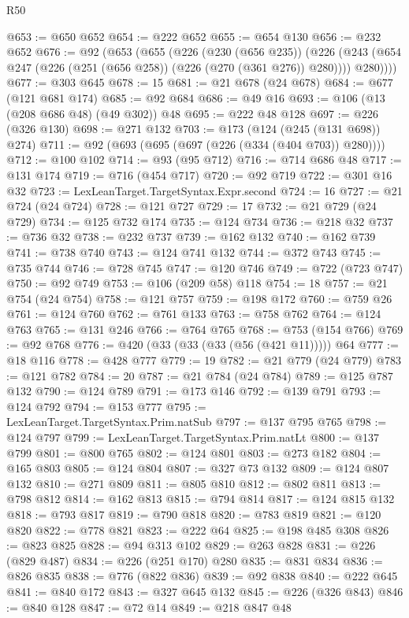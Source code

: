 \begin{lexlean}{R50}
\begin{coremodule}
{{{{{{{{{{{{{{{{{{{{{{{{{{{{{{{{{{{{{{{{{{{{{{{{{{{{{{{{{{{{@653 := @650 @652
@654 := @222 @652
@655 := @654 @130
@656 := @232 @652
@676 := @92
    (@653
      (@655
        (@226
          (@230 (@656 @235))
          (@226 (@243 (@654 @247 (@226 (@251 (@656 @258)) (@226 (@270 (@361 @276)) @280)))) @280))))
@677 := @303 @645
@678 := 15
@681 := @21 @678 (@24 @678)
@684 := @677 (@121 @681 @174)
@685 := @92 @684
@686 := @49 @16
@693 := @106 (@13 (@208 @686 @48) (@49 @302)) @48
@695 := @222 @48 @128
@697 := @226 (@326 @130)
@698 := @271 @132
@703 := @173 (@124 (@245 (@131 @698)) @274)
@711 := @92 (@693 (@695 (@697 (@226 (@334 (@404 @703)) @280))))
@712 := @100 @102
@714 := @93 (@95 @712)
@716 := @714 @686 @48
@717 := @131 @174
@719 := @716 (@454 @717)
@720 := @92 @719
@722 := @301 @16 @32
@723 := LexLeanTarget.TargetSyntax.Expr.second
@724 := 16
@727 := @21 @724 (@24 @724)
@728 := @121 @727
@729 := 17
@732 := @21 @729 (@24 @729)
@734 := @125 @732 @174
@735 := @124 @734
@736 := @218 @32
@737 := @736 @32
@738 := @232 @737
@739 := @162 @132
@740 := @162 @739
@741 := @738 @740
@743 := @124 @741 @132
@744 := @372 @743
@745 := @735 @744
@746 := @728 @745
@747 := @120 @746
@749 := @722 (@723 @747)
@750 := @92 @749
@753 := @106 (@209 @58) @118
@754 := 18
@757 := @21 @754 (@24 @754)
@758 := @121 @757
@759 := @198 @172
@760 := @759 @26
@761 := @124 @760
@762 := @761 @133
@763 := @758 @762
@764 := @124 @763
@765 := @131 @246
@766 := @764 @765
@768 := @753 (@154 @766)
@769 := @92 @768
@776 := @420 (@33 (@33 (@33 (@56 (@421 @11))))) @64
@777 := @18 @116
@778 := @428 @777
@779 := 19
@782 := @21 @779 (@24 @779)
@783 := @121 @782
@784 := 20
@787 := @21 @784 (@24 @784)
@789 := @125 @787 @132
@790 := @124 @789
@791 := @173 @146
@792 := @139 @791
@793 := @124 @792
@794 := @153 @777
@795 := LexLeanTarget.TargetSyntax.Prim.natSub
@797 := @137 @795 @765
@798 := @124 @797
@799 := LexLeanTarget.TargetSyntax.Prim.natLt
@800 := @137 @799
@801 := @800 @765
@802 := @124 @801
@803 := @273 @182
@804 := @165 @803
@805 := @124 @804
@807 := @327 @73 @132
@809 := @124 @807 @132
@810 := @271 @809
@811 := @805 @810
@812 := @802 @811
@813 := @798 @812
@814 := @162 @813
@815 := @794 @814
@817 := @124 @815 @132
@818 := @793 @817
@819 := @790 @818
@820 := @783 @819
@821 := @120 @820
@822 := @778 @821
@823 := @222 @64
@825 := @198 @485 @308
@826 := @823 @825
@828 := @94 @313 @102
@829 := @263 @828
@831 := @226 (@829 @487)
@834 := @226 (@251 @170) @280
@835 := @831 @834
@836 := @826 @835
@838 := @776 (@822 @836)
@839 := @92 @838
@840 := @222 @645
@841 := @840 @172
@843 := @327 @645 @132
@845 := @226 (@326 @843)
@846 := @840 @128
@847 := @72 @14
@849 := @218 @847 @48
}}}}}}}}}}}}}}}}}}}}}}}}}}}}}}}}}}}}}}}}}}}}}}}}}}}}}}}}}}}}
\end{coremodule}
\end{lexlean}
